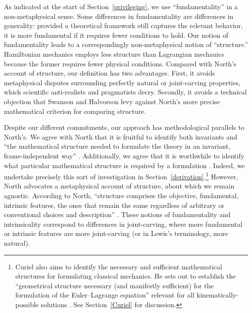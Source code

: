 \documentclass[12pt, english, twoside]{article} %
\begin{document}
As indicated at the start of Section~\ref{privileging}, we use ``fundamentality'' in a non-metaphysical sense. Some differences in fundamentality are differences in generality: provided a theoretical framework still captures the relevant behavior, it is more fundamental if it requires fewer conditions to hold. Our notion of fundamentality leads to a correspondingly non-metaphysical notion of ``structure.'' Hamiltonian mechanics employs less structure than Lagrangian mechanics because the former requires fewer physical conditions. Compared with North's \parencites*[]{North} account of structure, our definition has two advantages. First, it avoids metaphysical disputes surrounding perfectly natural or joint-carving properties, which scientific anti-realists and pragmatists decry. Secondly, it avoids a technical objection that Swanson and Halvorson \parencites*[]{Swanson} levy against North's more precise mathematical criterion for comparing structure. 

Despite our different commitments, our approach has methodological parallels to North's. We agree with North that it is fruitful to identify both invariants and ``the mathematical structure needed to formulate the theory in an invariant, frame-independent way'' \parencites*[65]{North}. Additionally, we agree that it is worthwhile to identify what particular mathematical structure is required by a formulation \parencites[78]{North}. Indeed, we undertake precisely this sort of investigation in Section~\ref{derivation}.\footnote{Curiel also aims to identify the necessary and sufficient mathematical structures for formulating classical mechanics. He sets out to establish the ``geometrical structure necessary (and manifestly sufficient) for the formulation of the Euler--Lagrange equation'' relevant for all kinematically-possible solutions \parencites*[292]{Curiel}. See Section~\ref{Curiel} for discussion.} However, North advocates a metaphysical account of structure, about which we remain agnostic. According to North, ``structure comprises the objective, fundamental, intrinsic features, the ones that remain the same regardless of arbitrary or conventional choices and description'' \parencites*[66]{North}. These notions of fundamentality and intrinsicality correspond to differences in joint-carving, where more fundamental or intrinsic features are more joint-carving (or in Lewis's \parencites*[]{Lewis1983} terminology, more natural). 
\end{document}
